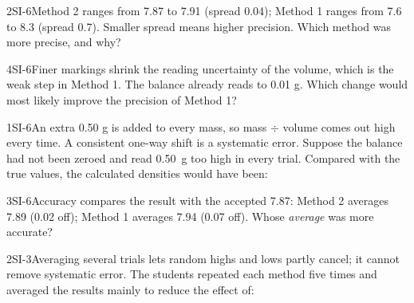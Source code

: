\documentclass[11pt]{article}
\begin{document}
\begin{q}{2}{SI-6}{Method 2 ranges from 7.87 to 7.91 (spread 0.04); Method 1 ranges from 7.6 to 8.3 (spread 0.7). Smaller spread means higher precision.}
Which method was more precise, and why?
\end{q}

\begin{q}{4}{SI-6}{Finer markings shrink the reading uncertainty of the volume, which is the weak step in Method 1. The balance already reads to 0.01 g.}
Which change would most likely improve the precision of Method 1?
\end{q}

\begin{q}{1}{SI-6}{An extra 0.50 g is added to every mass, so mass $\div$ volume comes out high every time. A consistent one-way shift is a systematic error.}
Suppose the balance had not been zeroed and read \SI{0.50}{\gram} too high in every trial. Compared with the true values, the calculated densities would have been:
\end{q}

\begin{q}{3}{SI-6}{Accuracy compares the result with the accepted 7.87: Method 2 averages 7.89 (0.02 off); Method 1 averages 7.94 (0.07 off).}
Whose \emph{average} was more accurate?
\end{q}

\begin{q}{2}{SI-3}{Averaging several trials lets random highs and lows partly cancel; it cannot remove systematic error.}
The students repeated each method five times and averaged the results mainly to reduce the effect of:
\end{q}
\end{document}
